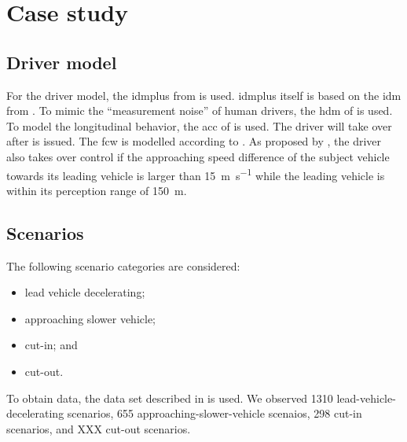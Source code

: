 \section{Case study}
\label{sec:case study}



\subsection{Driver model}
\label{sec:driver model}

For the driver model, the \ac{idmplus} from \autocite{schakel2010effects} is used. 
\ac{idmplus} itself is based on the \ac{idm} from \autocite{treiber2000congested}.
To mimic the ``measurement noise'' of human drivers, the \ac{hdm} of \autocite{treiber2006delays} is used.
To model the longitudinal behavior, the \ac{acc} of \autocite{xiao2017realistic} is used. 
The driver will take over after  is issued.
The \ac{fcw} is modelled according to \autocite{kiefer2005developing}.
As proposed by \autocite{xiao2017realistic}, the driver also takes over control if the approaching speed difference of the subject vehicle towards its leading vehicle is larger than \SI{15}{\meter\per\second} while the leading vehicle is within its perception range of \SI{150}{\meter}.



\subsection{Scenarios}
\label{sec:scenarios}

The following scenario categories are considered:
\begin{itemize}
    \item lead vehicle decelerating;
    \item approaching slower vehicle;
    \item cut-in; and
    \item cut-out.
\end{itemize}


To obtain data, the data set described in \autocite{paardekooper2019dataset6000km} is used. We observed 1310 lead-vehicle-decelerating scenarios, 655 approaching-slower-vehicle scenaios, 298 cut-in scenarios, and XXX cut-out scenarios.
